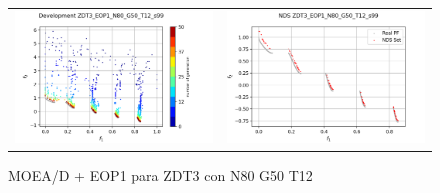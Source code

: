 \begin{figure}[H]
\begin{tabular}{c c}
    \includegraphics[scale=0.5]{figures/ZDT3_EOP1_N80_G50_T12/s99_dev.png} &
    \includegraphics[scale=0.5]{figures/ZDT3_EOP1_N80_G50_T12/s99_nds.png}\\
    \end{tabular}
    \caption{MOEA/D + EOP1 para ZDT3 con N80 G50 T12 }
    \label{fig:8}
\end{figure}

